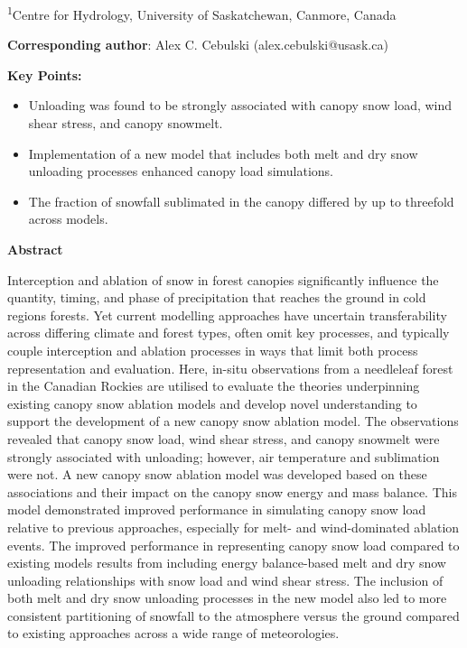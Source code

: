 \documentclass[
]{agujournal2019}
\providecommand{\tightlist}{%
  \setlength{\itemsep}{0pt}\setlength{\parskip}{0pt}}
\begin{document}
\textsuperscript{1}Centre for Hydrology, University of Saskatchewan,
Canmore, Canada

\textbf{Corresponding author}: Alex C. Cebulski (alex.cebulski@usask.ca)

\textbf{Key Points:}

\begin{itemize}
\tightlist
\item
  Unloading was found to be strongly associated with canopy snow load,
  wind shear stress, and canopy snowmelt.
\item
  Implementation of a new model that includes both melt and dry snow
  unloading processes enhanced canopy load simulations.
\item
  The fraction of snowfall sublimated in the canopy differed by up to
  threefold across models.
\end{itemize}

\textbf{Abstract}

Interception and ablation of snow in forest canopies significantly
influence the quantity, timing, and phase of precipitation that reaches
the ground in cold regions forests. Yet current modelling approaches
have uncertain transferability across differing climate and forest
types, often omit key processes, and typically couple interception and
ablation processes in ways that limit both process representation and
evaluation. Here, in-situ observations from a needleleaf forest in the
Canadian Rockies are utilised to evaluate the theories underpinning
existing canopy snow ablation models and develop novel understanding to
support the development of a new canopy snow ablation model. The
observations revealed that canopy snow load, wind shear stress, and
canopy snowmelt were strongly associated with unloading; however, air
temperature and sublimation were not. A new canopy snow ablation model
was developed based on these associations and their impact on the canopy
snow energy and mass balance. This model demonstrated improved
performance in simulating canopy snow load relative to previous
approaches, especially for melt- and wind-dominated ablation events. The
improved performance in representing canopy snow load compared to
existing models results from including energy balance-based melt and dry
snow unloading relationships with snow load and wind shear stress. The
inclusion of both melt and dry snow unloading processes in the new model
also led to more consistent partitioning of snowfall to the atmosphere
versus the ground compared to existing approaches across a wide range of
meteorologies.
\end{document}
